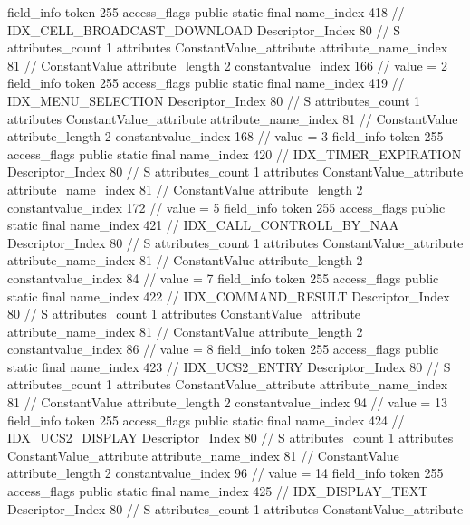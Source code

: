 {{{{{{{				}
				}
			}
			field_info {
				token	255
				access_flags	public static final
				name_index	418		// IDX_CELL_BROADCAST_DOWNLOAD
				Descriptor_Index	80		// S
				attributes_count	1
				attributes {
				ConstantValue_attribute {
					attribute_name_index	81		// ConstantValue
					attribute_length	2
					constantvalue_index	166		// value = 2
				}
				}
			}
			field_info {
				token	255
				access_flags	public static final
				name_index	419		// IDX_MENU_SELECTION
				Descriptor_Index	80		// S
				attributes_count	1
				attributes {
				ConstantValue_attribute {
					attribute_name_index	81		// ConstantValue
					attribute_length	2
					constantvalue_index	168		// value = 3
				}
				}
			}
			field_info {
				token	255
				access_flags	public static final
				name_index	420		// IDX_TIMER_EXPIRATION
				Descriptor_Index	80		// S
				attributes_count	1
				attributes {
				ConstantValue_attribute {
					attribute_name_index	81		// ConstantValue
					attribute_length	2
					constantvalue_index	172		// value = 5
				}
				}
			}
			field_info {
				token	255
				access_flags	public static final
				name_index	421		// IDX_CALL_CONTROLL_BY_NAA
				Descriptor_Index	80		// S
				attributes_count	1
				attributes {
				ConstantValue_attribute {
					attribute_name_index	81		// ConstantValue
					attribute_length	2
					constantvalue_index	84		// value = 7
				}
				}
			}
			field_info {
				token	255
				access_flags	public static final
				name_index	422		// IDX_COMMAND_RESULT
				Descriptor_Index	80		// S
				attributes_count	1
				attributes {
				ConstantValue_attribute {
					attribute_name_index	81		// ConstantValue
					attribute_length	2
					constantvalue_index	86		// value = 8
				}
				}
			}
			field_info {
				token	255
				access_flags	public static final
				name_index	423		// IDX_UCS2_ENTRY
				Descriptor_Index	80		// S
				attributes_count	1
				attributes {
				ConstantValue_attribute {
					attribute_name_index	81		// ConstantValue
					attribute_length	2
					constantvalue_index	94		// value = 13
				}
				}
			}
			field_info {
				token	255
				access_flags	public static final
				name_index	424		// IDX_UCS2_DISPLAY
				Descriptor_Index	80		// S
				attributes_count	1
				attributes {
				ConstantValue_attribute {
					attribute_name_index	81		// ConstantValue
					attribute_length	2
					constantvalue_index	96		// value = 14
				}
				}
			}
			field_info {
				token	255
				access_flags	public static final
				name_index	425		// IDX_DISPLAY_TEXT
				Descriptor_Index	80		// S
				attributes_count	1
				attributes {
				ConstantValue_attribute {
}}}}}}}
